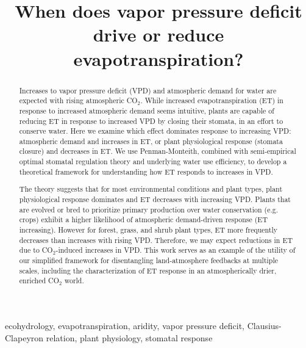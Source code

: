 \documentclass[draft,linenumbers]{agujournal}
\begin{document}
\title{When does vapor pressure deficit drive or reduce
  evapotranspiration?}



 


\begin{keypoints}
\item ecohydrology, evapotranspiration, aridity, vapor pressure
  deficit, Clausius-Clapeyron relation, plant physiology, stomatal
  response
\end{keypoints}


\begin{abstract}
  Increases to vapor pressure deficit (VPD) and atmospheric demand for
  water are expected with rising atmospheric CO$_2$. While increased
  evapotranspiration (ET) in response to increased atmospheric demand
  seems intuitive, plants are capable of reducing ET in response to
  increased VPD by closing their stomata, in an effort to conserve
  water. Here we examine which effect dominates response to increasing
  VPD: atmospheric demand and increases in ET, or plant physiological
  response (stomata closure) and decreases in ET. We use
  Penman-Monteith, combined with semi-empirical optimal stomatal
  regulation theory and underlying water use efficiency, to develop a
  theoretical framework for understanding how ET responds to increases
  in VPD.
  
  The theory suggests that for most environmental conditions and plant
  types, plant physiological response dominates and ET decreases with
  increasing VPD. Plants that are evolved or bred to prioritize
  primary production over water conservation (e.g. crops) exhibit a
  higher likelihood of atmospheric demand-driven response (ET
  increasing). However for forest, grass, and shrub plant types, ET
  more frequently decreases than increases with rising VPD. Therefore,
  we may expect reductions in ET due to CO$_2$-induced increases in
  VPD. This work serves as an example of the utility of our simplified
  framework for disentangling land-atmosphere feedbacks at multiple
  scales, including the characterization of ET response in an
  atmospherically drier, enriched CO$_2$ world.
 
\end{abstract}
\end{document}
